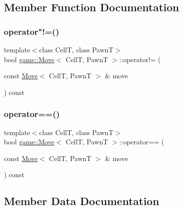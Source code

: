 \subsection{Member Function Documentation}
\mbox{\label{structgame_1_1_move_a0c266ecff843b21cafcd55c2d7bced38}} 
\subsubsection{\texorpdfstring{operator"!=()}{operator!=()}}
{\footnotesize\ttfamily template$<$class CellT, class PawnT$>$ \\
bool \hyperlink{structgame_1_1_move}{game\+::\+Move}$<$ CellT, PawnT $>$\+::operator!= (\begin{DoxyParamCaption}\item[{const \hyperlink{structgame_1_1_move}{Move}$<$ CellT, PawnT $>$ \&}]{move }\end{DoxyParamCaption}) const\hspace{0.3cm}{\ttfamily [inline]}}

\mbox{\label{structgame_1_1_move_a918b67ede1970df0d939c22244d739a1}} 
\subsubsection{\texorpdfstring{operator==()}{operator==()}}
{\footnotesize\ttfamily template$<$class CellT, class PawnT$>$ \\
bool \hyperlink{structgame_1_1_move}{game\+::\+Move}$<$ CellT, PawnT $>$\+::operator== (\begin{DoxyParamCaption}\item[{const \hyperlink{structgame_1_1_move}{Move}$<$ CellT, PawnT $>$ \&}]{move }\end{DoxyParamCaption}) const\hspace{0.3cm}{\ttfamily [inline]}}



\subsection{Member Data Documentation}
\mbox{\label{structgame_1_1_move_a62701eabfac32f5f950e69df1d82ed90}} 

